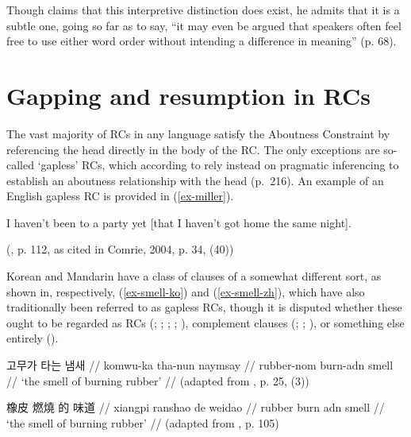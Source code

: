 \noindent Though \textcite{huang1982} claims that this interpretive distinction does exist, he admits that it is a subtle one, going so far as to say, ``it may even be argued that speakers often feel free to use either word order without intending a difference in meaning'' (p. 68).

\section{Gapping and resumption in RCs}\label{pro-aboutness}

The vast majority of RCs in any language satisfy the Aboutness Constraint by referencing the head directly in the body of the RC. The only exceptions are so-called `gapless' RCs, which according to \textcite{radford2019} rely instead on pragmatic inferencing to establish an aboutness relationship with the head (p.~216). An example of an English gapless RC is provided in (\ref{ex-miller}).

\ex\label{ex-miller}
I haven't been to a party yet [that I haven't got home the same night].
\par\nobreak\vspace{5pt}
\hfill (\cite{miller1993}, p. 112, as cited in Comrie, 2004, p. 34, (40))
\xe

\noindent Korean and Mandarin have a class of clauses of a somewhat different sort, as shown in, respectively, (\ref{ex-smell-ko}) and (\ref{ex-smell-zh}), which have also traditionally been referred to as gapless RCs, though it is disputed whether these ought to be regarded as RCs (\cite{cha2005,cha1999}; \cite{ning1993}; \cite{tsai1997}; \cite{yeom2015}; \cite{yeon2021}), complement clauses (\cite{huang.etal2009}; \cite{kim2011a}; \cite{tsai2008}), or something else entirely (\cite{zhang2008}).

\ex[everygla=\ko]
\begingl
\gla 고무가 타는 냄새 //
\glb komwu-ka tha-nun naymsay //
\glc rubber-{\sc nom} burn-{\sc adn} smell //
\glft `the smell of burning rubber' //
\vspace{5pt}
\hfill (adapted from \cite{cha1999}, p. 25, (3))
\endgl \label{ex-smell-ko}
\xe

\ex[everygla=\zh]
\begingl
\gla 橡皮 燃燒 的 味道 //
\glb xiangpi ranshao de weidao //
\glc rubber burn {\sc adn} smell //
\glft `the smell of burning rubber' //
\vspace{5pt}
\hfill (adapted from \cite{zhang2008}, p. 105)
\endgl \label{ex-smell-zh}
\xe


